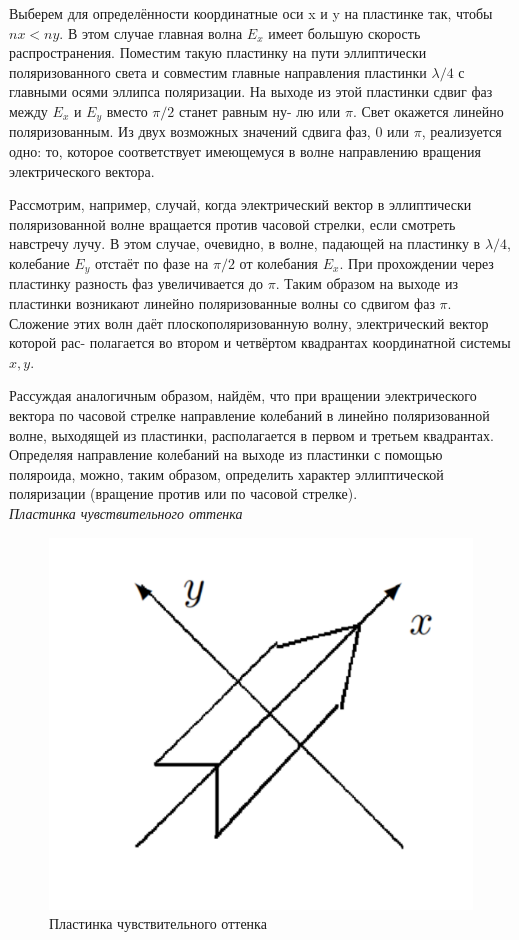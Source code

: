 \documentclass[a4paper, 12pt]{article}%
\begin{document}
	Выберем для определённости координатные оси x и y на пластинке
	так, чтобы $ nx < ny $. В этом случае главная волна $ E_x $ имеет большую
	скорость распространения. Поместим такую пластинку на пути эллиптически поляризованного света и совместим главные направления пластинки $ \lambda/4 $ с главными осями эллипса поляризации. На выходе из этой
	пластинки сдвиг фаз между $ E_x $ и $ E_y $ вместо $ \pi/2 $ станет равным ну-
	лю или $ \pi $. Свет окажется линейно поляризованным. Из двух возможных значений сдвига фаз, 0 или $ \pi $, реализуется одно: то, которое соответствует имеющемуся в волне направлению вращения электрического вектора.
	
	Рассмотрим, например, случай, когда электрический вектор в эллиптически поляризованной волне вращается против часовой стрелки,
	если смотреть навстречу лучу. В этом случае, очевидно, в волне, падающей на пластинку в $ \lambda/4 $, колебание $ E_y $ отстаёт по фазе на $ \pi/2 $ от
	колебания $ E_x $. При прохождении через пластинку разность фаз увеличивается до $ \pi $. Таким образом на выходе из пластинки возникают линейно поляризованные волны со сдвигом фаз $ \pi $. Сложение этих волн
	даёт плоскополяризованную волну, электрический вектор которой рас-
	полагается во втором и четвёртом квадрантах координатной системы
	$ x, y $.
	
	Рассуждая аналогичным образом, найдём, что при вращении электрического вектора по часовой стрелке направление колебаний в линейно поляризованной волне, выходящей из пластинки, располагается в первом и третьем квадрантах. Определяя направление колебаний на выходе из пластинки с помощью поляроида, можно, таким образом, определить характер эллиптической поляризации (вращение против или по часовой стрелке).\\
	
	\textit{Пластинка чувствительного оттенка}\\
	
	\begin{figure}
		\includegraphics[width=\linewidth]{3}
		\caption{Пластинка
			чувствительного
			оттенка}
		\label{ris 3}
	\end{figure}
	
\end{document}

